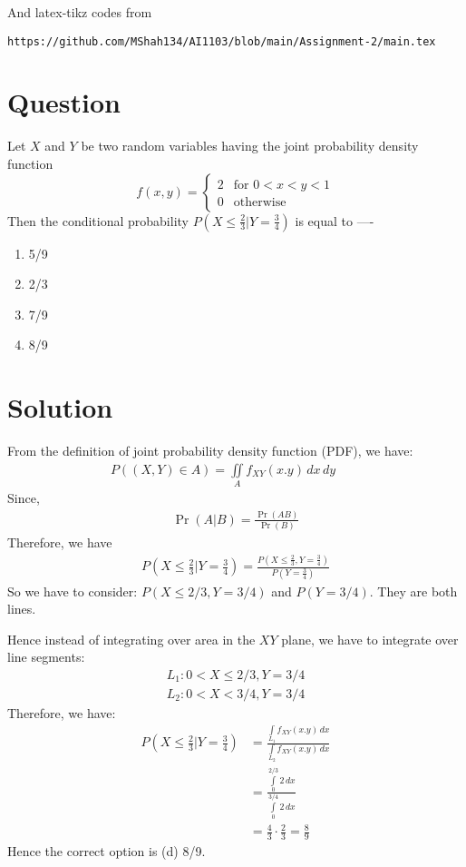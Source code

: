 \documentclass[journal,12pt,twocolumn]{IEEEtran}
\begin{document}
And latex-tikz codes from 
\begin{lstlisting}
https://github.com/MShah134/AI1103/blob/main/Assignment-2/main.tex
\end{lstlisting}

\section*{Question}
Let $X$ and $Y$ be two random variables having the joint probability density function
\[
    f(x,y) = \begin{cases}
        2 & \text{for } 0 < x < y < 1\\
        0 & \text{otherwise}
        \end{cases} 
  \] 
Then the conditional probability $P(X\leq \frac{2}{3}|Y = \frac{3}{4})$ is equal to ----
\begin{enumerate}
    \item 5/9
    \item 2/3
    \item 7/9
    \item 8/9
\end{enumerate}
\section*{Solution}
From the definition of joint probability density function (PDF), we have:
\begin{align}
P((X,Y)\in A) = 
\iint\limits_A f_{XY}(x.y)\,dx\,dy\qquad
\end{align}
Since,
\begin{align}
\Pr(A|B)=\frac{\Pr(AB)}{\Pr(B)}    
\end{align}
Therefore, we have 
\begin{align}
P(X\leq \frac{2}{3}|Y = \frac{3}{4}) = \frac{P(X\leq \frac{2}{3}, Y = \frac{3}{4})}{P(Y = \frac{3}{4})}  
\end{align}
So we have to consider: $P(X \leq 2/3, Y = 3/4)$ and $P(Y = 3/4)$. They are both lines. 

Hence instead of integrating over area in the $XY$ plane, we have to integrate over line segments:
\begin{align}
L_1 : 0 < X \leq 2/3, Y = 3/4 \\
L_2 : 0 < X < 3/4, Y = 3/4  
\end{align}
Therefore, we have:
\begin{align}
P(X\leq \frac{2}{3}|Y = \frac{3}{4}) &= \frac{\int\limits_{L_1} f_{XY}(x.y)\,dx}{\int\limits_{L_2} f_{XY}(x.y)\,dx}  \\
&= \frac{\int\limits_{0}^{2/3} 2\,dx}{\int\limits_{0}^{3/4} 2\,dx} \\
&= \frac{4}{3} \cdot \frac{2}{3} = \frac{8}{9}
\end{align}
Hence the correct option is (d) 8/9.
\end{document}
